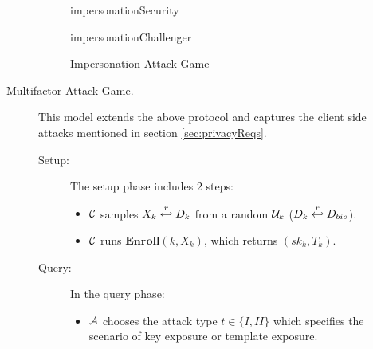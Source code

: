 \begin{description}
\begin{description}
    \begin{figure}[!h]
      \begin{center}
        \begin{bbrenv}{impersonationSecurity}
          \begin{bbrbox}[name=Adversary, minheight=2cm]
          \end{bbrbox}
          \begin{bbrchallenger}{impersonationChallenger}
            \begin{bbrbox}[name=Challenger]
            \end{bbrbox}
          \end{bbrchallenger}
        \end{bbrenv}
      \end{center}
      \caption{Impersonation Attack Game}
      \label{fig:impersonationAttackGame}
    \end{figure}


  \item[Multifactor Attack Game.] This model extends the above protocol and
    captures the client side attacks mentioned in section \ref{sec:privacyReqs}.
    \begin{description}
    \item[Setup:] The setup phase includes 2 steps:
      \begin{itemize}
      \item $\mathcal{C}$ samples $X_k \stackrel{r}{\hookleftarrow} D_{k}$ from a random
        $\mathcal{U}_k$ ($D_k \stackrel{r}{\hookleftarrow} D_{bio}$).
      \item $\mathcal{C}$ runs $\textbf{Enroll}(k, X_k)$, which returns $(sk_k, T_k)$.
      \end{itemize}
    \item[Query:] In the query phase:
      \begin{itemize}
      \item $\mathcal{A}$ chooses the attack type $t \in \{I,II\}$ which specifies
        the scenario of key exposure or template exposure.


\end{itemize}
\end{description}
\end{description}
\end{description}
